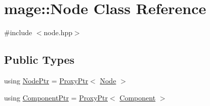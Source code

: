 \hypertarget{classmage_1_1_node}{}\section{mage\+:\+:Node Class Reference}
\label{classmage_1_1_node}


{\ttfamily \#include $<$node.\+hpp$>$}

\subsection*{Public Types}
\begin{DoxyCompactItemize}
\item 
using \hyperlink{classmage_1_1_node_ac575dc006e0ae1134277ade977dc06b6}{Node\+Ptr} = \hyperlink{classmage_1_1_proxy_ptr}{Proxy\+Ptr}$<$ \hyperlink{classmage_1_1_node}{Node} $>$
\item 
using \hyperlink{classmage_1_1_node_a46b7e1f4f5b98bfa78ed96a80797a4ba}{Component\+Ptr} = \hyperlink{classmage_1_1_proxy_ptr}{Proxy\+Ptr}$<$ \hyperlink{classmage_1_1_component}{Component} $>$
\end{DoxyCompactItemize}
